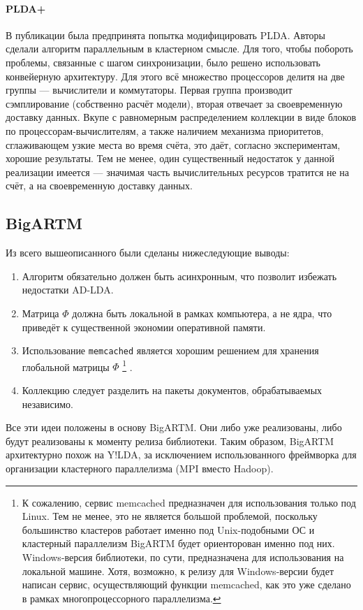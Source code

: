 \paragraph{PLDA+}
В публикации \cite{plda_plus} была предпринята попытка модифицировать PLDA. Авторы сделали алгоритм параллельным в кластерном смысле. Для того, чтобы побороть проблемы, связанные с шагом синхронизации, было решено использовать конвейерную архитектуру. Для этого всё множество процессоров делитя на две группы --- вычислители и коммутаторы. Первая группа производит сэмплирование (собственно расчёт модели), вторая отвечает за своевременную доставку данных. Вкупе с равномерным распределением коллекции в виде блоков по процессорам-вычислителям, а также наличием механизма приоритетов, сглаживающем узкие места во время счёта, это даёт, согласно экспериментам, хорошие результаты. Тем не менее, один существенный недостаток у данной реализации имеется --- значимая часть вычислительных ресурсов тратится не на счёт, а на своевременную доставку данных.

\subsection{BigARTM}
Из всего вышеописанного были сделаны нижеследующие выводы:

\begin{enumerate}
	\item Алгоритм обязательно должен быть асинхронным, что позволит избежать недостатки AD-LDA.
	\item Матрица $\Phi$ должна быть локальной в рамках компьютера, а не ядра, что приведёт к существенной экономии оперативной памяти.
	\item Использование \verb|memcached| является хорошим решением для хранения глобальной матрицы $\Phi$
	\footnote{К сожалению, сервис memcached предназначен для использования только под Linux. Тем не менее, это не является большой проблемой, поскольку большинство кластеров работает именно под Unix-подобными ОС и кластерный параллелизм BigARTM будет ориенторован именно под них. Windows-версия библиотеки, по сути, предназначена для использования на локальной машине. Хотя, возможно, к релизу для Windows-версии будет написан сервис, осуществляющий функции memcached, как это уже сделано в рамках многопроцессорного параллелизма.}
	.
	\item Коллекцию следует разделить на пакеты документов, обрабатываемых независимо.
\end{enumerate}

Все эти идеи положены в основу BigARTM. Они либо уже реализованы, либо будут реализованы к моменту релиза библиотеки.
Таким образом, BigARTM архитектурно похож на Y!LDA, за исключением использованного фреймворка для организации кластерного параллелизма (MPI вместо Hadoop).